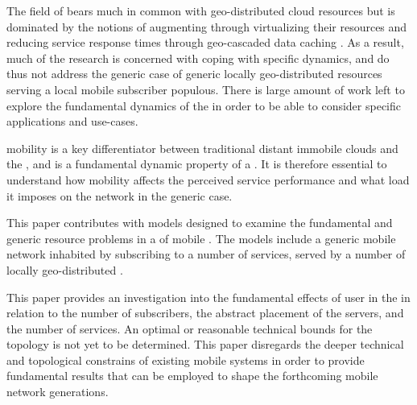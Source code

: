 The field of \xcloud{} bears much in common with geo-distributed cloud resources but is dominated by the notions of augmenting \ues{} through virtualizing their resources \cite{6563280} and reducing service response times through geo-cascaded data caching \cite{1437087,ericsson_akami}. As a result, much of the research is concerned with coping with specific dynamics, and do thus not address the generic case of generic locally geo-distributed resources serving a local mobile subscriber populous. There is large amount of work left to explore the fundamental dynamics of the \xcloud{} in order to be able to consider specific applications and use-cases.

\Ue{} mobility is a key differentiator between traditional distant immobile clouds and the \xcloud{}, and is a fundamental dynamic property of a \xcloud{}. It is therefore essential to understand how \ue{} mobility affects the perceived service performance and what load it imposes on the network in the generic case.

This paper contributes with models designed to examine the fundamental and generic resource problems in a \xcloud{} of mobile \ues{}. The models include a generic mobile network inhabited by \ues{} subscribing to a number of services, served by a number of locally geo-distributed \dcs{}.

This paper provides an investigation into the fundamental effects of user \ue{} in the \xcloud{} in relation to the number of subscribers, the abstract placement of the servers, and the number of services. An optimal or reasonable technical bounds for the \xcloud{} topology is not yet to be determined. This paper disregards the deeper technical and topological constrains of existing mobile systems in order to provide fundamental results that can be employed to shape the forthcoming mobile network generations.